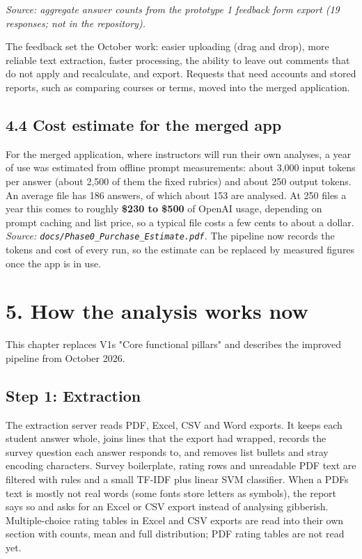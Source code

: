 \documentclass[
  11pt,
]{article}
\begin{document}
\emph{Source: aggregate answer counts from the prototype 1 feedback form export
(19 responses; not in the repository).}

The feedback set the October work: easier uploading (drag and drop), more
reliable text extraction, faster processing, the ability to leave out comments
that do not apply and recalculate, and export. Requests that need accounts and
stored reports, such as comparing courses or terms, moved into the merged
application.

\subsection{4.4 Cost estimate for the merged
app}\label{44-cost-estimate-for-the-merged-app}

For the merged application, where instructors will run their own analyses, a
year of use was estimated from offline prompt measurements: about 3,000 input
tokens per answer (about 2,500 of them the fixed rubrics) and about 250 output
tokens. An average file has 186 answers, of which about 153 are analysed. At 250
files a year this comes to roughly \textbf{\$230 to \$500} of OpenAI usage,
depending on prompt caching and list price, so a typical file costs a few cents
to about a dollar. \emph{Source: \texttt{docs/Phase0\_Purchase\_Estimate.pdf}.}
The pipeline now records the tokens and cost of every run, so the estimate can
be replaced by measured figures once the app is in use.

\section{5. How the analysis works now}\label{5-how-the-analysis-works-now}

This chapter replaces V1\textquotesingle s "Core functional pillars" and
describes the improved pipeline from October 2026.

\subsection{Step 1: Extraction}\label{step-1-extraction}

The extraction server reads PDF, Excel, CSV and Word exports. It keeps each
student answer whole, joins lines that the export had wrapped, records the
survey question each answer responds to, and removes list bullets and stray
encoding characters. Survey boilerplate, rating rows and unreadable PDF text are
filtered with rules and a small TF-IDF plus linear SVM classifier. When a
PDF\textquotesingle s text is mostly not real words (some fonts store letters as
symbols), the report says so and asks for an Excel or CSV export instead of
analysing gibberish. Multiple-choice rating tables in Excel and CSV exports are
read into their own section with counts, mean and full distribution; PDF rating
tables are not read yet.
\end{document}
